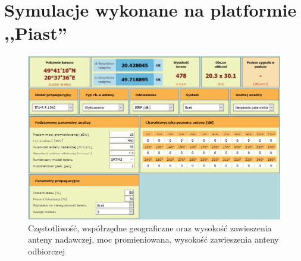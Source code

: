 \documentclass[12pt, a4paper, oneside]{article}
\begin{document}
\section{Symulacje wykonane na platformie ,,Piast''}
\begin{figure}[h!]
\centering
\includegraphics[scale=0.5]{pics/piast/f1.png}
\caption{Częstotliwość, współrzędne geograficzne oraz wysokość zawieszenia anteny nadawczej, moc promieniowana, wysokość zawieszenia anteny odbiorczej}
\end{figure}
\clearpage
\end{document}
